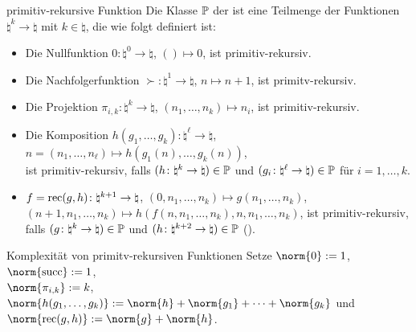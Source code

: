 \begin{Def}{primitiv-rekursive Funktion}
    Die Klasse $\mathbb{P}$ der  ist eine Teilmenge der Funktionen
    $\natural^k \rightarrow \natural$ mit $k \in \natural$, die wie folgt definiert ist:
    \begin{itemize}
        \item
        Die Nullfunktion
        $0\colon \natural^0 \rightarrow \natural$, $() \mapsto 0$, ist primitiv-rekursiv.

        \item
        Die Nachfolgerfunktion
        $\succ\colon \natural^1 \rightarrow \natural$, $n \mapsto n + 1$, ist primitv-rekursiv.

        \item
        Die Projektion
        $\pi_{i,k}\colon \natural^k \rightarrow \natural$, $(n_1, \dotsc, n_k) \mapsto n_i$,
        ist primitiv-rekursiv.

        \item
        Die Komposition
        $h(g_1, \dotsc, g_k)\colon \natural^\ell \rightarrow \natural$,
        $n = (n_1, \dotsc, n_\ell) \mapsto h(g_1(n), \dotsc, g_k(n))$,\\
        ist primitiv-rekursiv,
        falls $(h\colon \natural^k \rightarrow \natural) \in \mathbb{P}$ und
        $(g_i\colon \natural^\ell \rightarrow \natural) \in \mathbb{P}$ für $i = 1, \dotsc, k$.

        \item
        $f = \text{rec}(g, h)\colon \natural^{k+1} \rightarrow \natural$,
        $(0, n_1, \dotsc, n_k) \mapsto g(n_1, \dotsc, n_k)$,\\
        $(n + 1, n_1, \dotsc, n_k) \mapsto h(f(n, n_1, \dotsc, n_k), n, n_1, \dotsc, n_k)$,
        ist primitiv-rekursiv,\\
        falls $(g\colon \natural^k \rightarrow \natural) \in \mathbb{P}$ und
        $(h\colon \natural^{k+2} \rightarrow \natural) \in \mathbb{P}$
        ().
    \end{itemize}
\end{Def}

\begin{Def}{Komplexität von primitv-rekursiven Funktionen}
    Setze $\norm{0} := 1$,
    $\norm{\succ} := 1$,\\
    $\norm{\pi_{i,k}} := k$,
    $\norm{h(g_1, \dotsc, g_k)} := \norm{h} + \norm{g_1} + \dotsb + \norm{g_k}$ und
    $\norm{\rec(g, h)} := \norm{g} + \norm{h}$.
\end{Def}

